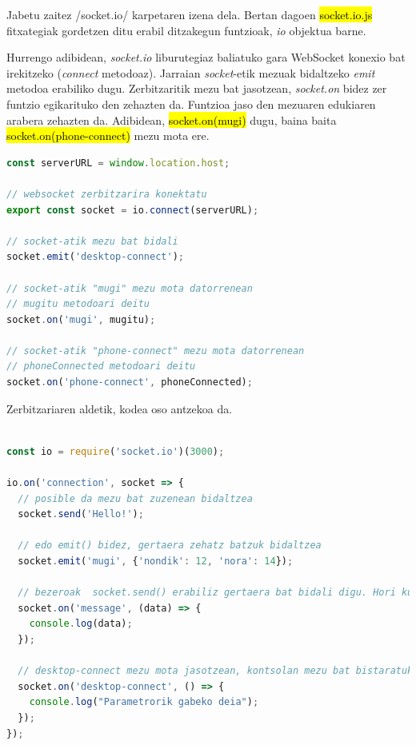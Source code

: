 Jabetu zaitez /socket.io/ karpetaren izena dela. Bertan dagoen \hl{socket.io.js}
fitxategiak gordetzen ditu erabil ditzakegun funtzioak, \textit{io} objektua barne. 

Hurrengo adibidean, \textit{socket.io} liburutegiaz baliatuko gara WebSocket konexio bat irekitzeko (\textit{connect} metodoaz). Jarraian \textit{socket}-etik mezuak bidaltzeko \textit{emit} metodoa erabiliko dugu.  Zerbitzaritik mezu bat jasotzean, \textit{socket.on} bidez zer funtzio egikarituko den zehazten da. Funtzioa jaso den mezuaren edukiaren arabera zehazten da. Adibidean, \hl{socket.on(\textquotesingle{}mugi\textquotesingle{})} dugu, baina baita \hl{socket.on(\textquotesingle{}phone-connect\textquotesingle{})} mezu mota ere. 

\begin{lstlisting}[language=JavaScript,numbers=none]
const serverURL = window.location.host;

// websocket zerbitzarira konektatu
export const socket = io.connect(serverURL);

// socket-atik mezu bat bidali
socket.emit('desktop-connect');

// socket-atik "mugi" mezu mota datorrenean
// mugitu metodoari deitu
socket.on('mugi', mugitu);

// socket-atik "phone-connect" mezu mota datorrenean
// phoneConnected metodoari deitu
socket.on('phone-connect', phoneConnected);

\end{lstlisting}

Zerbitzariaren aldetik, kodea oso antzekoa da.

\begin{lstlisting}[language=JavaScript,numbers=none]

const io = require('socket.io')(3000);

io.on('connection', socket => {
  // posible da mezu bat zuzenean bidaltzea
  socket.send('Hello!');

  // edo emit() bidez, gertaera zehatz batzuk bidaltzea
  socket.emit('mugi', {'nondik': 12, 'nora': 14});

  // bezeroak  socket.send() erabiliz gertaera bat bidali digu. Hori kudeatzeko:
  socket.on('message', (data) => {
    console.log(data);
  });

  // desktop-connect mezu mota jasotzean, kontsolan mezu bat bistaratuko dugu
  socket.on('desktop-connect', () => {
    console.log("Parametrorik gabeko deia");
  });
});

\end{lstlisting}

